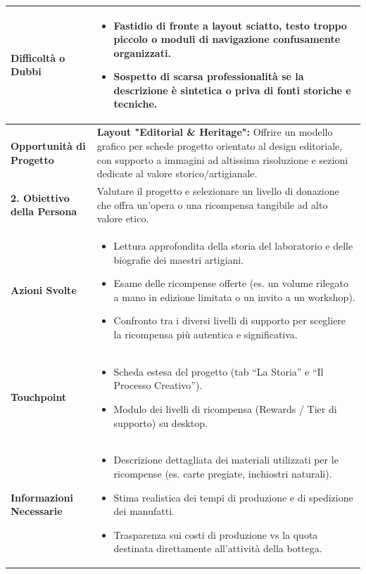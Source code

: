 \documentclass[11pt,a4paper]{article}
\begin{document}
\begin{table}[h!]
\begin{tabular}{|p{3.2cm}|p{11.8cm}|}
\textbf{Difficoltà o Dubbi} &
\begin{itemize}[leftmargin=*,nosep]
    \item Fastidio di fronte a layout sciatto, testo troppo piccolo o moduli di navigazione confusamente organizzati.
    \item Sospetto di scarsa professionalità se la descrizione è sintetica o priva di fonti storiche e tecniche.
\end{itemize} \\ \hline
\textbf{Opportunità di Progetto} &
\textbf{Layout "Editorial \& Heritage":} Offrire un modello grafico per schede progetto orientato al design editoriale, con supporto a immagini ad altissima risoluzione e sezioni dedicate al valore storico/artigianale. \\ \hline
\hline
\textbf{2. Obiettivo della Persona} & Valutare il progetto e selezionare un livello di donazione che offra un'opera o una ricompensa tangibile ad alto valore etico. \\ \hline
\textbf{Azioni Svolte} &
\begin{itemize}[leftmargin=*,nosep]
    \item Lettura approfondita della storia del laboratorio e delle biografie dei maestri artigiani.
    \item Esame delle ricompense offerte (es. un volume rilegato a mano in edizione limitata o un invito a un workshop).
    \item Confronto tra i diversi livelli di supporto per scegliere la ricompensa più autentica e significativa.
\end{itemize} \\ \hline
\textbf{Touchpoint} &
\begin{itemize}[leftmargin=*,nosep]
    \item Scheda estesa del progetto (tab ``La Storia'' e ``Il Processo Creativo'').
    \item Modulo dei livelli di ricompensa (Rewards / Tier di supporto) su desktop.
\end{itemize} \\ \hline
\textbf{Informazioni Necessarie} &
\begin{itemize}[leftmargin=*,nosep]
    \item Descrizione dettagliata dei materiali utilizzati per le ricompense (es. carte pregiate, inchiostri naturali).
    \item Stima realistica dei tempi di produzione e di spedizione dei manufatti.
    \item Trasparenza sui costi di produzione vs la quota destinata direttamente all'attività della bottega.

\end{itemize}
\end{tabular}
\end{table}
\end{document}

